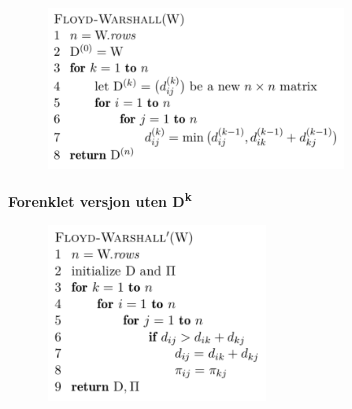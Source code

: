 \documentclass[12pt]{report}
\begin{document}
\begin{multicols}{2}



\begin{figure}[H]
	\begin{Center}
		\includegraphics[width=3.09in,height=1.68in]{./media/image135.png}
	\end{Center}
\end{figure}



\setlength{\parskip}{0.0pt}
\par


\vspace{\baselineskip}

\vspace{\baselineskip}
{\fontsize{11pt}{13.2pt}\selectfont \textbf{Forenklet versjon uten D\textsuperscript{k}}\par}\par




\begin{figure}[H]
	\begin{Center}
		\includegraphics[width=2.27in,height=1.83in]{./media/image136.png}
	\end{Center}
\end{figure}




\end{multicols}
\par
\end{document}

